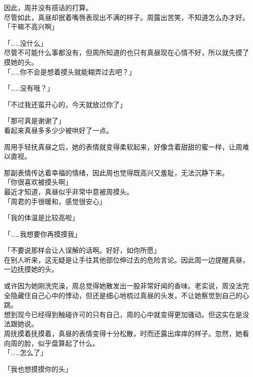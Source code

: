 因此，周并没有搭话的打算。\\

尽管如此，真昼却抿着嘴唇表现出不满的样子。周露出苦笑，不知道怎么办才好。\\

「干嘛不高兴啊」

「……没什么」\\

尽管不可能什么事都没有，但周所知道的也只有真昼现在心情不好，所以就先摸了摸她的头。\\

「……你不会是想着摸头就能糊弄过去吧？」

「……没有哦？」

「不过我还蛮开心的，今天就放过你了」

「那可真是谢谢了」\\

看起来真昼多多少少被哄好了一点。

周用手轻抚真昼之后，她的表情就变得柔软起来，好像含着甜甜的蜜一样，让周难以直视。

那副表情传达着幸福的情绪，因此周也觉得既高兴又羞耻，无法沉静下来。\\

「你很喜欢被摸头啊」\\

最近才知道，真昼似乎非常中意被周摸头。\\

「周君的手很暖和，感觉很安心」

「我的体温是比较高啦」

「……我想要你再摸摸我」

「不要说那样会让人误解的话啊。好好，如你所愿」\\

在别人听来，这无疑是让手往其他部位伸过去的危险言论。因此周一边提醒真昼，一边抚摸她的头。

或许因为她刚洗完澡，周总觉得她散发出一股非常好闻的香味。老实说，周没法完全隐藏住自己心中的悸动，但还是细心地梳过真昼的头发，不让她察觉到自己的心跳。\\

想到现今已经得到触碰许可的只有自己，周的心中就变得更加骚动。但这实在是没法跟她说。\\

周抚摸着抚摸着，真昼的表情变得十分松散，时而还露出痒痒的样子。忽然，她看向周的脸，似乎盘算起了什么。\\

「……怎么了」

「我也想摸摸你的头」

